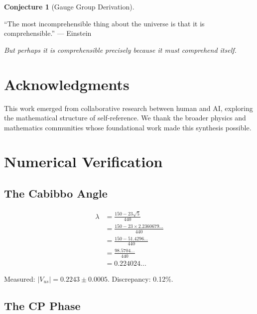 \documentclass[11pt,a4paper]{article}
\theoremstyle{plain}
\theoremstyle{definition}
\newtheorem{conjecture}[theorem]{Conjecture}
\theoremstyle{remark}
\begin{document}
\begin{conjecture}[Gauge Group Derivation]
\vspace{1cm}

\begin{center}
``The most incomprehensible thing about the universe is that it is comprehensible.'' --- Einstein

\vspace{0.5cm}
\textit{But perhaps it is comprehensible precisely because it must comprehend itself.}
\end{center}

\section*{Acknowledgments}

This work emerged from collaborative research between human and AI, exploring the mathematical structure of self-reference. We thank the broader physics and mathematics communities whose foundational work made this synthesis possible.

\appendix
\section{Numerical Verification}

\subsection{The Cabibbo Angle}

\begin{align*}
\lambda &= \frac{150 - 23\sqrt{5}}{440} \\
&= \frac{150 - 23 \times 2.2360679...}{440} \\
&= \frac{150 - 51.4296...}{440} \\
&= \frac{98.5704...}{440} \\
&= 0.224024...
\end{align*}

Measured: $|V_{us}| = 0.2243 \pm 0.0005$. Discrepancy: 0.12\%.

\subsection{The CP Phase}


\end{conjecture}
\end{document}
